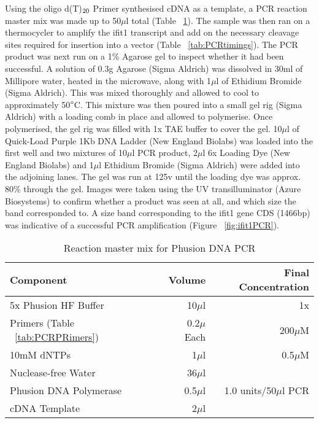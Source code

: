 Using the oligo d(T)$\textsubscript{20}$ Primer synthesised cDNA as a template, a PCR reaction master mix was made up to 50$\mu$l total (Table ~\ref{tab:PCRMasterMix}). The sample was then ran on a thermocycler to amplify the \acrshort{ifit1} transcript and add on the necessary cleavage sites required for insertion into a vector (Table ~\ref{tab:PCRtimings}). The PCR product was next run on a 1\% Agarose gel to inspect whether it had been successful. A solution of 0.3g Agarose (Sigma Aldrich) was dissolved in 30ml of Millipore water, heated in the microwave, along with 1$\mu$l of Ethidium Bromide (Sigma Aldrich). This was mixed thoroughly and allowed to cool to approximately 50$\degree$C. This mixture was then poured into a small gel rig (Sigma Aldrich) with a loading comb in place and allowed to polymerise. Once polymerised, the gel rig was filled with 1x TAE buffer to cover the gel. 10$\mu$l of Quick-Load Purple 1Kb DNA Ladder (New England Biolabs) was loaded into the first well and two mixtures of 10$\mu$l PCR product, 2$\mu$l 6x Loading Dye (New England Biolabs) and 1$\mu$l Ethidium Bromide (Sigma Aldrich) were added into the adjoining lanes. The gel was run at 125v until the loading dye was approx. 80\% through the gel. Images were taken using the UV transilluminator (Azure Biosystems) to confirm whether a product was seen at all, and which size the band corresponded to. A size band corresponding to the ifit1 gene CDS (1466bp) was indicative of a successful PCR amplification (Figure ~\ref{fig:ifit1PCR}).

\begin{table}[!htbp]
\centering
\begin{tabular}{lrr}
  Component                                   & Volume                & Final Concentration     \\
  \hline
  5x Phusion HF Buffer                        & 10$\mu$l              & 1x                      \\
  Primers (Table ~\ref{tab:PCRPRimers})       & 0.2$\mu$ Each         & 200$\mu$M               \\
  10mM dNTPs                                  & 1$\mu$l               & 0.5$\mu$M               \\
  Nuclease-free Water                         & 36$\mu$l              &                         \\
  Phusion DNA Polymerase                      & 0.5$\mu$l             & 1.0 units/50$\mu$l PCR  \\
  cDNA Template & 2$\mu$l & \\
\end{tabular}
\caption{Reaction master mix for Phusion DNA PCR}
\label{tab:PCRMasterMix}
\end{table}

